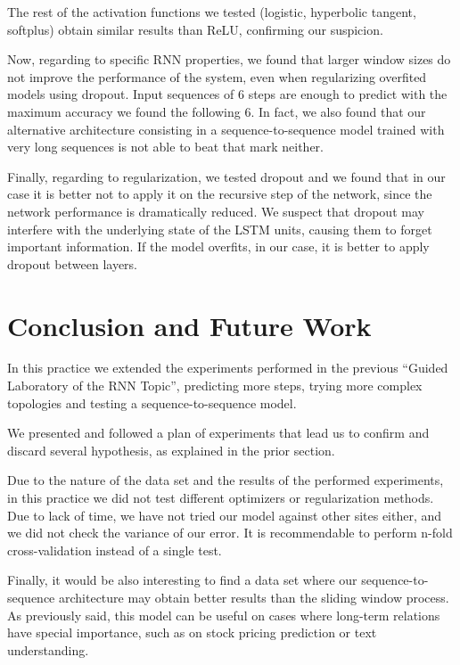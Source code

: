 \documentclass[]{article}
\begin{document}
The rest of the activation functions we tested (logistic, hyperbolic tangent, softplus) obtain similar results than ReLU, confirming our suspicion.

Now, regarding to specific RNN properties, we found that larger window sizes do not improve the performance of the system, even when regularizing overfited models using dropout. Input sequences of 6 steps are enough to predict with the maximum accuracy we found the following 6. In fact, we also found that our alternative architecture consisting in a sequence-to-sequence model trained with very long sequences is not able to beat that mark neither.

Finally, regarding to regularization, we tested dropout and we found that in our case it is better not to apply it on the recursive step of the network, since the network performance is dramatically reduced. We suspect that dropout may interfere with the underlying state of the LSTM units, causing them to forget important information. If the model overfits, in our case, it is better to apply dropout between layers.

\section{Conclusion and Future Work}

In this practice we extended the experiments performed in the previous ``Guided Laboratory of the RNN Topic'', predicting more steps, trying more complex topologies and testing a sequence-to-sequence model.

We presented and followed a plan of experiments that lead us to confirm and discard several hypothesis, as explained in the prior section.

Due to the nature of the data set and the results of the performed experiments, in this practice we did not test different optimizers or regularization methods. Due to lack of time, we have not tried our model against other sites either, and we did not check the variance of our error. It is recommendable to perform n-fold cross-validation instead of a single test.

Finally, it would be also interesting to find a data set where our sequence-to-sequence architecture may obtain better results than the sliding window process. As previously said, this model can be useful on cases where long-term relations have special importance, such as on stock pricing prediction or text understanding.

{}

\end{document}
